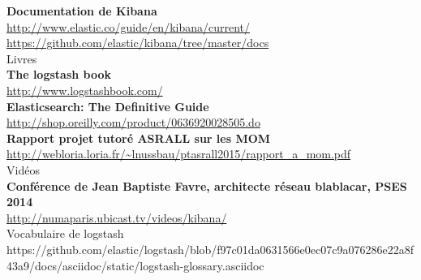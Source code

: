\textbf{Documentation de Kibana}\\
\url{http://www.elastic.co/guide/en/kibana/current/}\\
\url{https://github.com/elastic/kibana/tree/master/docs}\\[3mm]


{\huge Livres}\\[5mm]

\textbf{The logstash book}\\
\url{http://www.logstashbook.com/}\\[1mm]

\textbf{Elasticsearch: The Definitive Guide}\\
\url{http://shop.oreilly.com/product/0636920028505.do}\\[1mm]

\textbf{Rapport projet tutoré ASRALL sur les MOM}\\
\url{http://webloria.loria.fr/~lnussbau/ptasrall2015/rapport\_a\_mom.pdf}\\[3mm]


{\huge Vidéos}\\[5mm]

\textbf{Conférence de Jean Baptiste Favre, architecte réseau blablacar, PSES 2014}\\
\url{http://numaparis.ubicast.tv/videos/kibana/}\\[3mm]





Vocabulaire de logstash
https://github.com/elastic/logstash/blob/f97c01da0631566e0ec07c9a076286e22a8f43a9/docs/asciidoc/static/logstash-glossary.asciidoc

